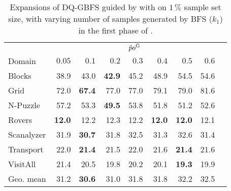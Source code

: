 \begin{table}[!h]
\centering
\caption[Expansions of \pog with varying values of $k_{1}$]{Expansions of DQ-GBFS guided by \hnn with \pog on $1\,\%$ sample set size, with varying number of samples generated by BFS ($k_{1}$) in the first phase of \bfsrs.}
\label{tab:bfsss_pct}
\vspace{\baselineskip}
\begin{tabular}{lrrrrrrrr}
\toprule
& \multicolumn{7}{c}{$\hat po^{\text{G}}$} \\
\cmidrule(lr){2-8}
Domain     & $0.05$ &$0.1$ & $0.2$   & $0.3$ & $0.4$ & $0.5$ & $0.6$ \\ \midrule
Blocks     & 38.9   & 43.0  & \textbf{42.9}  & 45.2  & 48.9  & 54.5  & 54.6  \\
Grid       & 72.0   & \textbf{67.4}  & 77.0  & 77.0  & 79.1  & 79.0  & 81.6  \\
N-Puzzle   & 57.2   & 53.3  & \textbf{49.5}  & 53.8  & 51.8  & 51.2  & 52.6  \\
Rovers     & \textbf{12.0}   & 12.2  & 12.3  & 12.2  & \textbf{12.0}  & \textbf{12.0}  & 12.1  \\
Scanalyzer & 31.9   & \textbf{30.7}  & 31.8  & 32.5  & 31.3  & 32.6  & 31.4  \\
Transport  & 22.0   & \textbf{21.4}  & 21.5  & 22.0  & 21.6  & \textbf{21.4}  & 21.6  \\
VisitAll   & 21.4   & 20.5  & 19.8  & 20.2  & 20.1  & \textbf{19.3}  & 19.9  \\ \midrule
Geo. mean  & 31.2   & \textbf{30.6}  & 31.0  & 31.8  & 31.8  & 32.2  & 32.5  \\ \bottomrule
\end{tabular}
\end{table}
